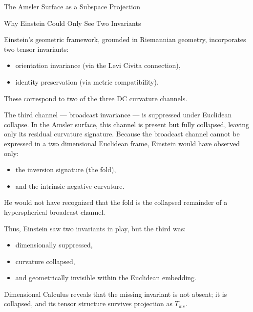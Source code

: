 \documentclass[final,onefignum,onetabnum]{siamart}
\begin{document}
\begin{section}{The Amsler Surface as a Subspace Projection}
\begin{subsection}{Why Einstein Could Only See Two Invariants}

Einstein’s geometric framework, grounded in Riemannian geometry, incorporates two tensor invariants:

\begin{itemize}
    \item orientation invariance (via the Levi Civita connection),
    \item identity preservation (via metric compatibility).
    \end{itemize}
    
These correspond to two of the three DC curvature channels.

The third channel — broadcast invariance — is suppressed under Euclidean collapse. In the Amsler surface, this channel is present but fully collapsed, leaving only its residual curvature signature. Because the broadcast channel cannot be expressed in a two dimensional Euclidean frame, Einstein would have observed only:

\begin{itemize}
    \item the inversion signature (the fold),
    \item and the intrinsic negative curvature.
    \end{itemize}
    
He would not have recognized that the fold is the collapsed remainder of a hyperspherical broadcast channel.

Thus, Einstein saw two invariants in play, but the third was:

\begin{itemize}
    \item dimensionally suppressed,
    \item curvature collapsed,
    \item and geometrically invisible within the Euclidean embedding.
    \end{itemize}
    
Dimensional Calculus reveals that the missing invariant is not absent; it is collapsed, and its tensor structure survives projection as $T_{\mathrm{inv}}.$
\end{subsection}
\end{section}
\end{document}

